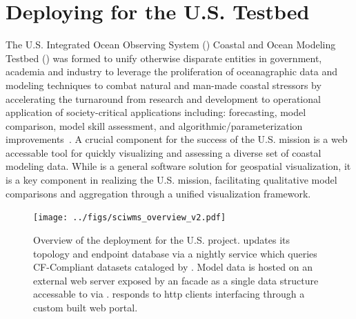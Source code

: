 \section{Deploying \sciwms{} for the U.S. \ioos{} \comt{} Testbed}

The U.S. Integrated Ocean Observing System (\ioos{}) Coastal and Ocean
Modeling Testbed (\comt{}) was formed to unify otherwise disparate
entities in government, academia and industry to leverage the
proliferation of oceanagraphic data and modeling techniques to combat
natural and man-made coastal stressors by accelerating the turnaround
from research and development to operational application of
society-critical applications including: forecasting, model
comparison, model skill assessment, and algorithmic/parameterization
improvements~\cite{luettich13}. A crucial component for the success of
the U.S. \ioos{} \comt{} mission is a web accessable tool for quickly
visualizing and assessing a diverse set of coastal modeling
data. While \sciwms{} is a general software solution for geospatial
visualization, it is a key component in realizing the U.S. \ioos{}
\comt{} mission, facilitating qualitative model comparisons and
aggregation through a unified visualization framework.
\begin{figure}[ht!]
  \centering
  \texttt{[image: ../figs/sciwms\_overview\_v2.pdf]}
  \caption{Overview of the \sciwms{} deployment for the U.S. \ioos{}
    \comt{} project. \Sciwms{} updates its topology and endpoint
    database via a nightly service which queries CF-Compliant datasets
    cataloged by \ngdc{}. Model data is hosted on an external web server
    exposed by an \ncml{} facade as a single \netcdf{} data structure
    accessable to \sciwms{} via \opendap{}. \Sciwms{} responds to http
    clients interfacing through a custom built web portal.}
  \label{fig:overview1}
\end{figure}

